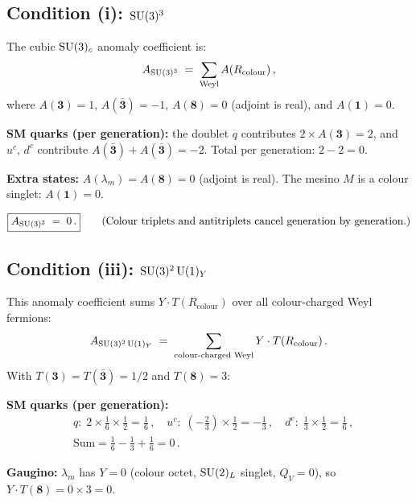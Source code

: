 \documentclass[11pt,a4paper]{article}
\begin{document}
\subsection{Condition (i): $\mathrm{SU}(3)^3$}

The cubic $\mathrm{SU}(3)_c$ anomaly coefficient is:
\begin{equation}\label{eq:su3-cubed}
  A_{\mathrm{SU}(3)^3}
  \;=\; \sum_{\text{Weyl}} A(R_{\text{colour}})\,,
\end{equation}
where $A(\mathbf{3}) = 1$, $A(\bar{\mathbf{3}}) = -1$,
$A(\mathbf{8}) = 0$ (adjoint is real), and $A(\mathbf{1}) = 0$.

\textbf{SM quarks (per generation):} the doublet $q$ contributes
$2 \times A(\mathbf{3}) = 2$, and $u^c$, $d^c$ contribute
$A(\bar{\mathbf{3}}) + A(\bar{\mathbf{3}}) = -2$.  Total per
generation: $2 - 2 = 0$.

\textbf{Extra states:} $A(\lambda_m) = A(\mathbf{8}) = 0$ (adjoint is
real).  The mesino $M$ is a colour singlet: $A(\mathbf{1}) = 0$.

\begin{equation}\label{eq:su3-result}
  \boxed{A_{\mathrm{SU}(3)^3} \;=\; 0\,.}
  \qquad \text{(Colour triplets and antitriplets cancel generation by generation.)}
\end{equation}

\subsection{Condition (iii): $\mathrm{SU}(3)^2\,\mathrm{U}(1)_Y$}

This anomaly coefficient sums $Y \cdot T(R_{\text{colour}})$ over all
colour-charged Weyl fermions:
\begin{equation}\label{eq:su3sq-u1}
  A_{\mathrm{SU}(3)^2\,\mathrm{U}(1)_Y}
  \;=\; \sum_{\text{colour-charged Weyl}} Y \cdot T(R_{\text{colour}})\,.
\end{equation}
With $T(\mathbf{3}) = T(\bar{\mathbf{3}}) = 1/2$ and
$T(\mathbf{8}) = 3$:

\textbf{SM quarks (per generation):}
\begin{align}
  &q:\; 2 \times \tfrac{1}{6} \times \tfrac{1}{2} = \tfrac{1}{6}\,,
  \quad
  u^c:\; (-\tfrac{2}{3}) \times \tfrac{1}{2} = -\tfrac{1}{3}\,,
  \quad
  d^c:\; \tfrac{1}{3} \times \tfrac{1}{2} = \tfrac{1}{6}\,,
  \nonumber\\
  &\text{Sum} = \tfrac{1}{6} - \tfrac{1}{3} + \tfrac{1}{6} = 0\,.
  \label{eq:su3sq-quarks}
\end{align}

\textbf{Gaugino:} $\lambda_m$ has $Y = 0$ (colour octet, $\mathrm{SU}(2)_L$
singlet, $Q_V = 0$), so $Y \cdot T(\mathbf{8}) = 0 \times 3 = 0$.
\end{document}
